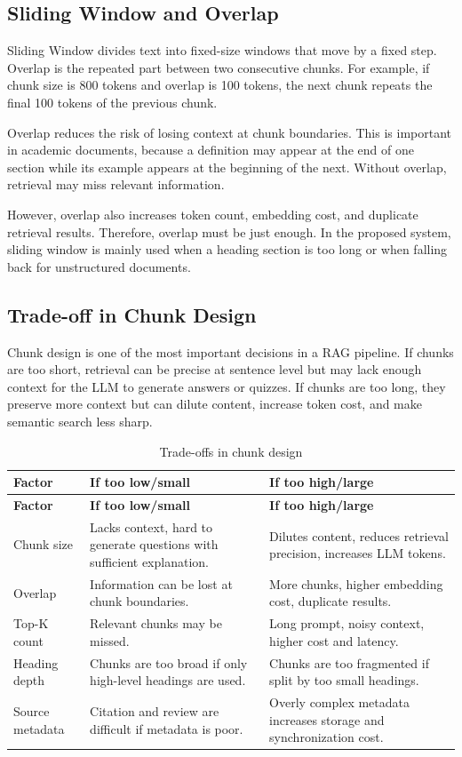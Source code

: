 \subsection{Sliding Window and Overlap}
\label{subsec:sliding-window-overlap}

Sliding Window divides text into fixed-size windows that move by a fixed
step. Overlap is the repeated part between two consecutive chunks. For
example, if chunk size is 800 tokens and overlap is 100 tokens, the next
chunk repeats the final 100 tokens of the previous chunk.

Overlap reduces the risk of losing context at chunk boundaries. This is
important in academic documents, because a definition may appear at the
end of one section while its example appears at the beginning of the next.
Without overlap, retrieval may miss relevant information.

However, overlap also increases token count, embedding cost, and duplicate
retrieval results. Therefore, overlap must be just enough. In the proposed
system, sliding window is mainly used when a heading section is too long
or when falling back for unstructured documents.

\subsection{Trade-off in Chunk Design}
\label{subsec:tradeoff-thiet-ke-chunk}

Chunk design is one of the most important decisions in a RAG pipeline. If
chunks are too short, retrieval can be precise at sentence level but may
lack enough context for the LLM to generate answers or quizzes. If chunks
are too long, they preserve more context but can dilute content, increase
token cost, and make semantic search less sharp.

\begin{longtable}{|p{3cm}|p{4.2cm}|p{6.8cm}|}
\caption{Trade-offs in chunk design}
\label{tab:chunking-tradeoff}\\
\hline
\textbf{Factor} & \textbf{If too low/small} & \textbf{If too high/large} \\
\hline
\endfirsthead
\hline
\textbf{Factor} & \textbf{If too low/small} & \textbf{If too high/large} \\
\hline
\endhead
Chunk size & Lacks context, hard to generate questions with sufficient explanation. & Dilutes content, reduces retrieval precision, increases LLM tokens. \\
\hline
Overlap & Information can be lost at chunk boundaries. & More chunks, higher embedding cost, duplicate results. \\
\hline
Top-K count & Relevant chunks may be missed. & Long prompt, noisy context, higher cost and latency. \\
\hline
Heading depth & Chunks are too broad if only high-level headings are used. & Chunks are too fragmented if split by too small headings. \\
\hline
Source metadata & Citation and review are difficult if metadata is poor. & Overly complex metadata increases storage and synchronization cost. \\
\hline
\end{longtable}

